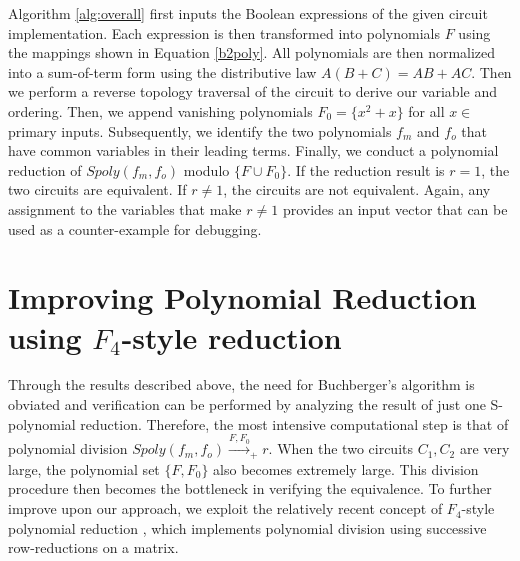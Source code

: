 Algorithm \ref{alg:overall} first inputs the Boolean expressions of
the given circuit implementation. Each expression is then transformed
into polynomials $F$ using the mappings shown in Equation
\ref{b2poly}. All polynomials are then normalized into a sum-of-term
form using the distributive law $A(B+C)=AB+AC$.  
Then we perform a reverse topology traversal of the circuit to
derive our  variable and ordering. Then, we append vanishing
polynomials $F_{0} =\{x^2 + x \}$ for all $x \in$ primary inputs.  
Subsequently, we identify the two polynomials $f_{m}$ and $f_{o}$ that
have common variables in their leading terms. Finally, we conduct a
polynomial reduction of $Spoly(f_{m},f_{o})$  modulo $\{F \cup F_{0}\}$.  
If the reduction result is $r = 1$, the two circuits are equivalent. 
If $r \neq 1$, the circuits are not equivalent. Again, any assignment
to the variables that make $r \neq 1$ provides an input vector that
can be used as a counter-example for debugging. 

\section{Improving Polynomial Reduction using $F_4$-style reduction}

Through the results described above, the need for Buchberger's
algorithm is obviated and verification can be performed by analyzing
the result of just one S-polynomial reduction. Therefore, the most
intensive computational step is that of polynomial division 
$Spoly(f_m,f_o) \stackrel{F,F_0}{\longrightarrow}_+ r$. When the two
circuits $C_1, C_2$ are very large, the polynomial set $\{F, F_0\}$
also becomes extremely large. This division procedure then becomes the
bottleneck in verifying the equivalence. To further improve upon our 
approach, we exploit the relatively recent concept of $F_4$-style
polynomial reduction \cite{f4}, which implements polynomial division
using successive row-reductions on a matrix. 




